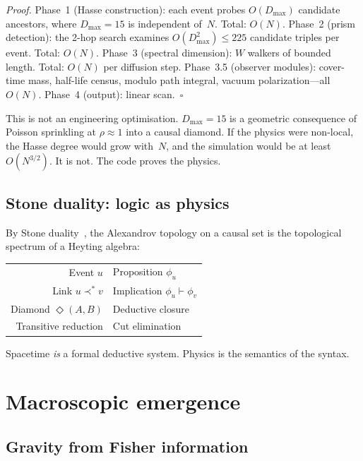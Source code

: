 \documentclass[aps,prd,twocolumn,superscriptaddress,nofootinbib,amsmath,amssymb,longbibliography]{revtex4-2}
\begin{document}
\emph{Proof.}
Phase~1 (Hasse construction): each event probes $O(D_{\max})$
candidate ancestors, where $D_{\max} = 15$ is independent of~$N$.
Total: $O(N)$.
Phase~2 (prism detection): the 2-hop search examines
$O(D_{\max}^2) \leq 225$ candidate triples per event.
Total: $O(N)$.
Phase~3 (spectral dimension): $W$ walkers of bounded length.
Total: $O(N)$ per diffusion step.
Phase~3.5 (observer modules): cover-time mass, half-life census,
modulo path integral, vacuum polarization---all $O(N)$.
Phase~4 (output): linear scan.~$\square$

This is not an engineering optimisation.
$D_{\max} = 15$ is a geometric consequence of Poisson sprinkling at
$\rho \approx 1$ into a causal diamond.
If the physics were non-local, the Hasse
degree would grow with~$N$, and the simulation would be at least
$O(N^{3/2})$.  It is not.  The code proves the physics.

\subsection{Stone duality: logic as physics}

By Stone duality~\cite{stone1936}, the Alexandrov topology on a causal
set is the topological spectrum of a Heyting algebra:
\begin{center}
\begin{tabular}{@{}r@{$\;\;\longleftrightarrow\;\;$}l@{}}
  Event $u$ & Proposition $\phi_u$ \\
  Link $u \prec^* v$ & Implication $\phi_u \vdash \phi_v$ \\
  Diamond $\Diamond(A,B)$ & Deductive closure \\
  Transitive reduction & Cut elimination
\end{tabular}
\end{center}
Spacetime \emph{is} a formal deductive system.
Physics is the semantics of the syntax.

\section{Macroscopic emergence}\label{sec:ir}

\subsection{Gravity from Fisher information}
\end{document}
